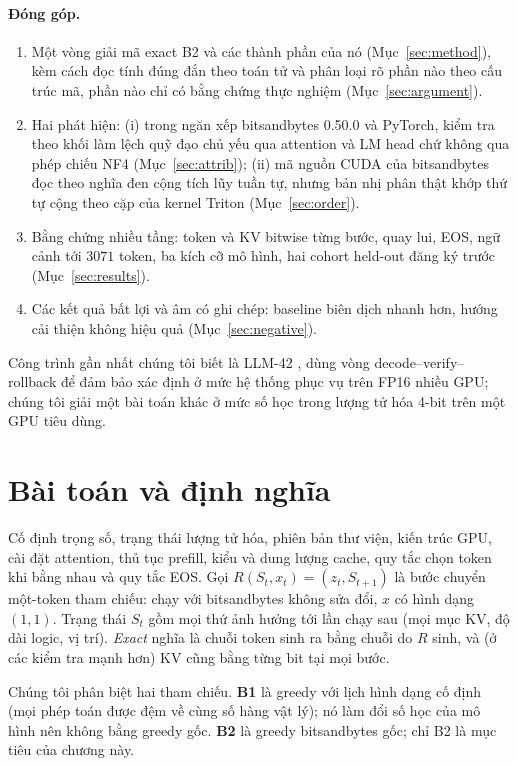 \paragraph{Đóng góp.}
\begin{enumerate}[nosep]
\item Một vòng giải mã exact B2 và các thành phần của nó (Mục~\ref{sec:method}), kèm cách đọc tính đúng đắn theo toán tử và phân loại rõ phần nào theo cấu trúc mã, phần nào chỉ có bằng chứng thực nghiệm (Mục~\ref{sec:argument}).
\item Hai phát hiện: (i) trong ngăn xếp bitsandbytes 0.50.0 và PyTorch, kiểm tra theo khối làm lệch quỹ đạo chủ yếu qua attention và LM head chứ không qua phép chiếu NF4 (Mục~\ref{sec:attrib}); (ii) mã nguồn CUDA của bitsandbytes đọc theo nghĩa đen cộng tích lũy tuần tự, nhưng bản nhị phân thật khớp thứ tự cộng theo cặp của kernel Triton (Mục~\ref{sec:order}).
\item Bằng chứng nhiều tầng: token và KV bitwise từng bước, quay lui, EOS, ngữ cảnh tới $3071$ token, ba kích cỡ mô hình, hai cohort held-out đăng ký trước (Mục~\ref{sec:results}).
\item Các kết quả bất lợi và âm có ghi chép: baseline biên dịch nhanh hơn, hướng cải thiện không hiệu quả (Mục~\ref{sec:negative}).
\end{enumerate}
Công trình gần nhất chúng tôi biết là LLM-42 \cite{gond2026llm42}, dùng vòng decode--verify--rollback để đảm bảo xác định ở mức hệ thống phục vụ trên FP16 nhiều GPU; chúng tôi giải một bài toán khác ở mức số học trong lượng tử hóa 4-bit trên một GPU tiêu dùng.

\section{Bài toán và định nghĩa}
Cố định trọng số, trạng thái lượng tử hóa, phiên bản thư viện, kiến trúc GPU, cài đặt attention, thủ tục prefill, kiểu và dung lượng cache, quy tắc chọn token khi bằng nhau và quy tắc EOS. Gọi $R(S_t,x_t)=(z_t,S_{t+1})$ là bước chuyển một-token tham chiếu: chạy  với bitsandbytes không sửa đổi, $x$ có hình dạng $(1,1)$. Trạng thái $S_t$ gồm mọi thứ ảnh hưởng tới lần chạy sau (mọi mục KV, độ dài logic, vị trí). \emph{Exact} nghĩa là chuỗi token sinh ra bằng chuỗi do $R$ sinh, và (ở các kiểm tra mạnh hơn) KV cũng bằng từng bit tại mọi bước.

Chúng tôi phân biệt hai tham chiếu. \textbf{B1} là greedy với lịch hình dạng cố định (mọi phép toán được đệm về cùng số hàng vật lý); nó làm đổi số học của mô hình nên không bằng greedy gốc. \textbf{B2} là greedy bitsandbytes gốc; chỉ B2 là mục tiêu của chương này.

